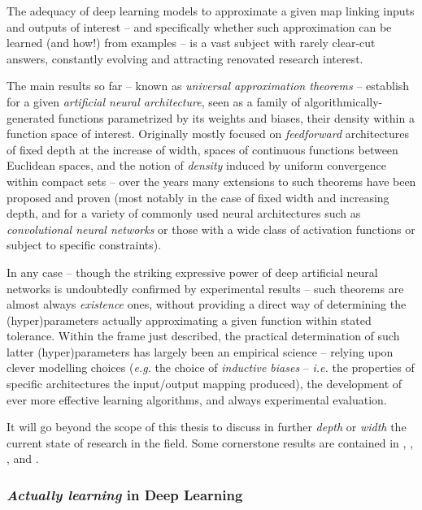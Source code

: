 The adequacy of deep learning models to approximate a given map linking inputs and outputs of interest -- and specifically whether such approximation can be learned (and how!) from examples -- is a vast subject with rarely clear-cut answers, constantly evolving and attracting renovated research interest.

The main results so far -- known as \textit{universal approximation theorems} -- establish for a given \textit{artificial neural architecture}, seen as a family of algorithmically-generated functions parametrized by its weights and biases, their density within a function space of interest. Originally mostly focused on \textit{feedforward} architectures of fixed depth at the increase of width, spaces of continuous functions between Euclidean spaces, and the notion of \textit{density} induced by uniform convergence within compact sets -- over the years many extensions to such theorems have been proposed and proven (most notably in the case of fixed width and increasing depth, and for a variety of commonly used neural architectures such as \textit{convolutional neural networks} or those with a wide class of activation functions or subject to specific constraints).

In any case -- though the striking expressive power of deep artificial neural networks is undoubtedly confirmed by experimental results -- such theorems are almost always \textit{existence} ones, without providing a direct way of determining the (hyper)parameters actually approximating a given function within stated tolerance. Within the frame just described, the practical determination of such latter (hyper)parameters has largely been an empirical science -- relying upon clever modelling choices (\textit{e.g.} the choice of \textit{inductive biases} -- \textit{i.e.} the properties of specific architectures \wrt the input/output mapping produced), the development of ever more effective learning algorithms, and always experimental evaluation.

It will go beyond the scope of this thesis to discuss in further \textit{depth} or \textit{width} the current state of research in the field. Some cornerstone results are contained in \cite{HornikEtAl1989Approx}, \cite{Hornik1991Approx}, \cite{LinEtAl2018Approx}, \cite{KidgerLyons2020Approx} and \cite{Xu2018ApproxGNN}.


\subsubsection{\textit{Actually learning} in Deep Learning}

